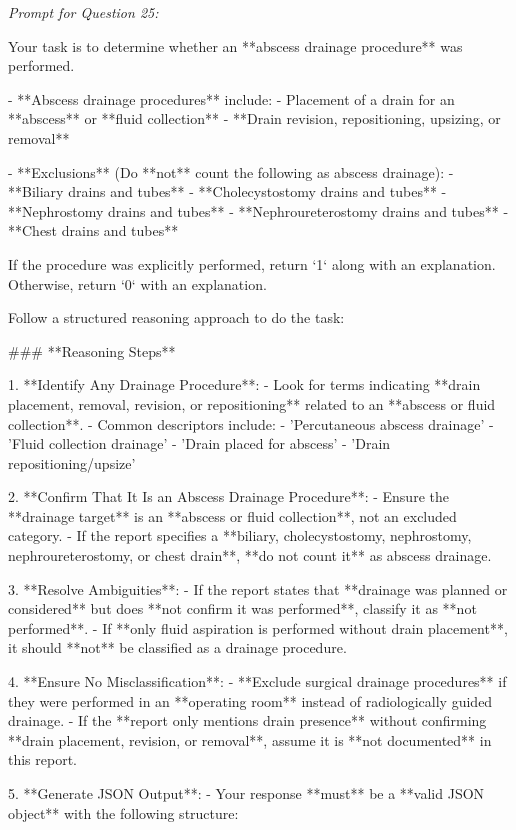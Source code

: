 \textit{\normalsize Prompt for Question  25:}
\begin{mdframed}[]
\normalsize

Your task is to determine whether an **abscess drainage procedure** was performed.  

- **Abscess drainage procedures** include:  
  - Placement of a drain for an **abscess** or **fluid collection**  
  - **Drain revision, repositioning, upsizing, or removal**  

- **Exclusions** (Do **not** count the following as abscess drainage):  
  - **Biliary drains and tubes**  
  - **Cholecystostomy drains and tubes**  
  - **Nephrostomy drains and tubes**  
  - **Nephroureterostomy drains and tubes**  
  - **Chest drains and tubes**  

If the procedure was explicitly performed, return `1` along with an explanation. Otherwise, return `0` with an explanation.

Follow a structured reasoning approach to do the task:

### **Reasoning Steps**  

1. **Identify Any Drainage Procedure**:  
   - Look for terms indicating **drain placement, removal, revision, or repositioning** related to an **abscess or fluid collection**.  
   - Common descriptors include:  
     - 'Percutaneous abscess drainage'  
     - 'Fluid collection drainage'  
     - 'Drain placed for abscess'  
     - 'Drain repositioning/upsize'  

2. **Confirm That It Is an Abscess Drainage Procedure**:  
   - Ensure the **drainage target** is an **abscess or fluid collection**, not an excluded category.  
   - If the report specifies a **biliary, cholecystostomy, nephrostomy, nephroureterostomy, or chest drain**, **do not count it** as abscess drainage.  

3. **Resolve Ambiguities**:  
   - If the report states that **drainage was planned or considered** but does **not confirm it was performed**, classify it as **not performed**.  
   - If **only fluid aspiration is performed without drain placement**, it should **not** be classified as a drainage procedure.  

4. **Ensure No Misclassification**:  
   - **Exclude surgical drainage procedures** if they were performed in an **operating room** instead of radiologically guided drainage.  
   - If the **report only mentions drain presence** without confirming **drain placement, revision, or removal**, assume it is **not documented** in this report.  

5. **Generate JSON Output**:  
   - Your response **must** be a **valid JSON object** with the following structure:  

\end{mdframed}

